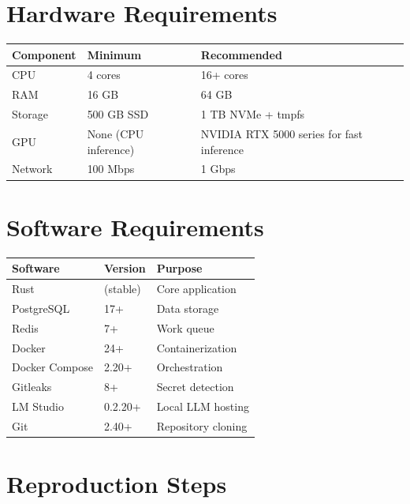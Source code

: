 \section{Hardware Requirements}\label{sect:hardware-req}

\begin{table}[h]
\centering
\begin{tabular}{|l|l|l|}
\hline
\textbf{Component} & \textbf{Minimum} & \textbf{Recommended} \\
\hline
CPU & 4 cores & 16+ cores \\
\hline
RAM & 16 GB & 64 GB \\
\hline
Storage & 500 GB SSD & 1 TB NVMe + tmpfs \\
\hline
GPU & None (CPU inference) & NVIDIA RTX 5000 series for fast inference \\
\hline
Network & 100 Mbps & 1 Gbps \\
\hline
\end{tabular}
\end{table}

\section{Software Requirements}\label{sect:software-req}

\begin{table}[h]
\centering
\begin{tabular}{|l|l|l|}
\hline
\textbf{Software} & \textbf{Version} & \textbf{Purpose} \\
\hline
Rust & (stable) & Core application \\
\hline
PostgreSQL & 17+ & Data storage \\
\hline
Redis & 7+ & Work queue \\
\hline
Docker & 24+ & Containerization \\
\hline
Docker Compose & 2.20+ & Orchestration \\
\hline
Gitleaks & 8+ & Secret detection \\
\hline
LM Studio & 0.2.20+ & Local LLM hosting \\
\hline
Git & 2.40+ & Repository cloning \\
\hline
\end{tabular}
\end{table}

\section{Reproduction Steps}\label{sect:reproduction-steps}

